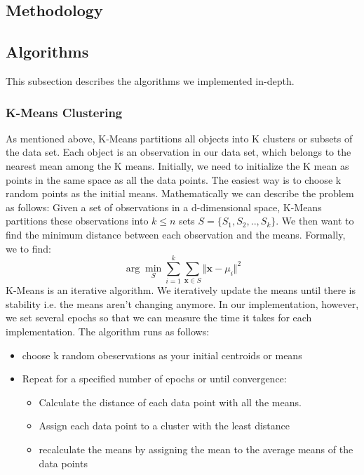\begin{multicols*}{2}
    \section{Methodology}
    \subsection{Algorithms}
    This subsection describes the algorithms we implemented in-depth. 
    \subsubsection{K-Means Clustering}
    As mentioned above, K-Means partitions all objects into K clusters or subsets of the data set. Each object is an observation in our data set, which belongs to the nearest mean among the K means. Initially, we need to initialize the K mean as points in the same space as all the data points. The easiest way is to choose k random points as the initial means. Mathematically we can describe the problem as follows:
    Given a set of observations in a d-dimensional space,  K-Means partitions these observations into $k\leq n$ sets $S = \{S_1, S_2 , .. ,S_k\}$. We then want to find the minimum distance between each observation and the means. Formally, we to find:
    \begin{equation}
        \arg \min_S\sum_{i = 1}^{k}\sum_{\mathbf{x}\in S} \Vert \mathbf{x} - \mu_i \Vert^2   
    \end{equation}  
    K-Means is an iterative algorithm. We iteratively update the means until there is stability i.e. the means aren't changing anymore. In our implementation, however, we set several epochs so that we can measure the time it takes for each implementation. 
    The algorithm runs as follows:
    \begin{itemize}
        \item choose k random obeservations as your initial centroids or means
        \item Repeat for a specified number of epochs or until convergence:
        \begin{itemize}
            \item Calculate the distance of each data point with all the means.
            \item Assign each data point to a cluster with the least distance
            \item recalculate the means by assigning the mean to the average means of the data points 
        \end{itemize}
    \end{itemize}



\end{multicols*}


